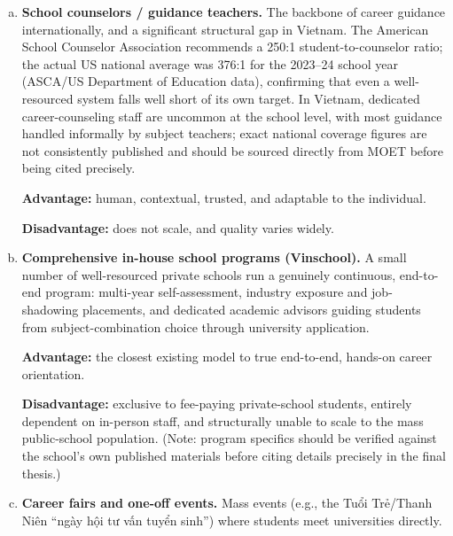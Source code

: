 \documentclass[a4paper]{article}
\begin{document}
\begin{enumerate}[a.]
    \setlength{\itemsep}{1em}
    \item \textbf{School counselors / guidance teachers.} The backbone of career guidance
    internationally, and a significant structural gap in Vietnam. The American School
    Counselor Association recommends a 250:1 student-to-counselor ratio; the actual US national
    average was 376:1 for the 2023--24 school year (ASCA/US Department of Education data),
    confirming that even a well-resourced system falls well short of its own target. In
    Vietnam, dedicated career-counseling staff are uncommon at the school level, with most
    guidance handled informally by subject teachers; exact national coverage figures are not
    consistently published and should be sourced directly from MOET before being cited
    precisely.

    \par\smallskip\noindent
    \textbf{Advantage:} human, contextual, trusted, and adaptable to the individual.

    \par\smallskip\noindent
    \textbf{Disadvantage:} does not scale, and quality varies widely.

    \item \textbf{Comprehensive in-house school programs (Vinschool).} A small number of
    well-resourced private schools run a genuinely continuous, end-to-end program: multi-year
    self-assessment, industry exposure and job-shadowing placements, and dedicated academic
    advisors guiding students from subject-combination choice through university application.

    \par\smallskip\noindent
    \textbf{Advantage:} the closest existing model to true end-to-end, hands-on career
    orientation.

    \par\smallskip\noindent
    \textbf{Disadvantage:} exclusive to fee-paying private-school students,
    entirely dependent on in-person staff, and structurally unable to scale to the mass
    public-school population. (Note: program specifics should be verified against the school's
    own published materials before citing details precisely in the final thesis.)

    \item \textbf{Career fairs and one-off events.} Mass events (e.g., the Tuổi Trẻ/Thanh Niên
    ``ngày hội tư vấn tuyển sinh'') where students meet universities directly.


\end{enumerate}
\end{document}
